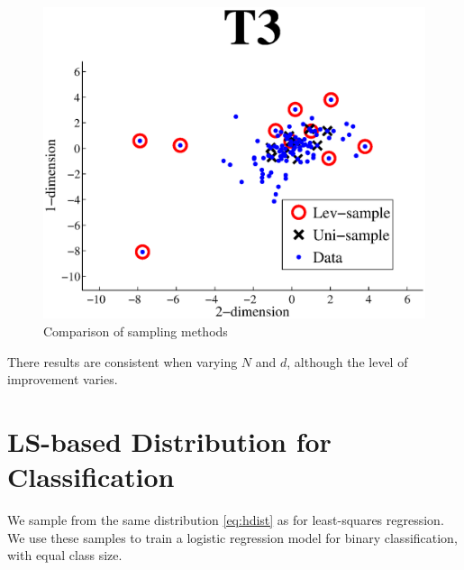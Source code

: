 \documentclass{article}
\begin{document}
\begin{figure}[b]
	\centering
    \includegraphics[width=.5\linewidth]{images/selection.eps}
        \caption{Comparison of sampling methods}
\end{figure}

There results are consistent when varying $N$ and $d$, although the level of improvement varies.
%
\section{LS-based Distribution for Classification}

We sample from the same distribution \eqref{eq:hdist} as for least-squares regression. We use these samples to train a logistic regression model for binary classification, with equal class size.
  
\end{document}
